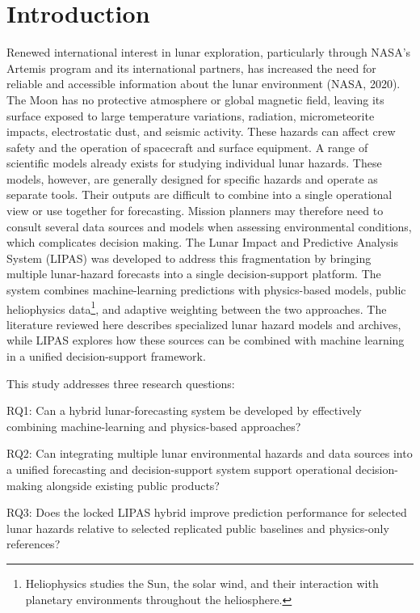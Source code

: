 \section{Introduction}

Renewed international interest in lunar exploration, particularly through NASA's Artemis program and its international partners, has increased the need for reliable and accessible information about the lunar environment (NASA, 2020). The Moon has no protective atmosphere or global magnetic field, leaving its surface exposed to large temperature variations, radiation, micrometeorite impacts, electrostatic dust, and seismic activity. These hazards can affect crew safety and the operation of spacecraft and surface equipment. A range of scientific models already exists for studying individual lunar hazards. These models, however, are generally designed for specific hazards and operate as separate tools. Their outputs are difficult to combine into a single operational view or use together for forecasting. Mission planners may therefore need to consult several data sources and models when assessing environmental conditions, which complicates decision making. The Lunar Impact and Predictive Analysis System (LIPAS) was developed to address this fragmentation by bringing multiple lunar-hazard forecasts into a single decision-support platform. The system combines machine-learning predictions with physics-based models, public heliophysics data\footnote{Heliophysics studies the Sun, the solar wind, and their interaction with planetary environments throughout the heliosphere.}, and adaptive weighting between the two approaches. The literature reviewed here describes specialized lunar hazard models and archives, while LIPAS explores how these sources can be combined with machine learning in a unified decision-support framework.

This study addresses three research questions:

RQ1: Can a hybrid lunar-forecasting system be developed by effectively combining machine-learning and physics-based approaches?

RQ2: Can integrating multiple lunar environmental hazards and data sources into a unified forecasting and decision-support system support operational decision-making alongside existing public products?

RQ3: Does the locked LIPAS hybrid improve prediction performance for selected lunar hazards relative to selected replicated public baselines and physics-only references?

